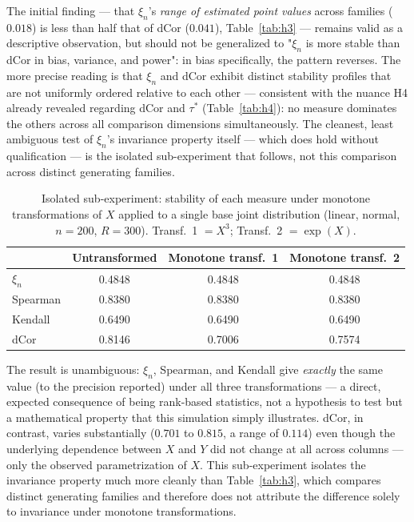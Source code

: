 \documentclass[article]{ajs}
\begin{document}
The initial finding --- that $\xi_n$'s \emph{range of estimated point
values} across families ($0.018$) is less than half that of dCor
($0.041$), Table~\ref{tab:h3} --- remains valid as a descriptive
observation, but should not be generalized to "$\xi_n$ is more stable
than dCor in bias, variance, and power": in bias specifically, the
pattern reverses. The more precise reading is that $\xi_n$ and dCor
exhibit distinct stability profiles that are not uniformly ordered
relative to each other --- consistent with the nuance H4 already
revealed regarding dCor and $\tau^\ast$ (Table~\ref{tab:h4}): no
measure dominates the others across all comparison dimensions
simultaneously. The cleanest, least ambiguous test of $\xi_n$'s
invariance property itself --- which does hold without qualification
--- is the isolated sub-experiment that follows, not this comparison
across distinct generating families.

\begin{table}[H]
\caption{\label{tab:h3invar}Isolated sub-experiment: stability of each measure under monotone transformations of $X$ applied to a single base joint distribution (linear, normal, $n=200$, $R=300$). Transf.\ 1 $=X^3$; Transf.\ 2 $=\exp(X)$.}
\begin{center}
\begin{tabular}{lccc}
\toprule
 & Untransformed & Monotone transf.\ 1 & Monotone transf.\ 2 \\
\midrule
$\xi_n$    & 0.4848 & 0.4848 & 0.4848 \\
Spearman   & 0.8380 & 0.8380 & 0.8380 \\
Kendall    & 0.6490 & 0.6490 & 0.6490 \\
dCor       & 0.8146 & 0.7006 & 0.7574 \\
\bottomrule
\end{tabular}
\end{center}
\end{table}

The result is unambiguous: $\xi_n$, Spearman, and Kendall give
\emph{exactly} the same value (to the precision reported) under all
three transformations --- a direct, expected consequence of being
rank-based statistics, not a hypothesis to test but a mathematical
property that this simulation simply illustrates. dCor, in contrast,
varies substantially ($0.701$ to $0.815$, a range of $0.114$) even
though the underlying dependence between $X$ and $Y$ did not change at
all across columns --- only the observed parametrization of $X$. This
sub-experiment isolates the invariance property much more cleanly than
Table~\ref{tab:h3}, which compares distinct generating families and
therefore does not attribute the difference solely to invariance under
monotone transformations.
\end{document}

